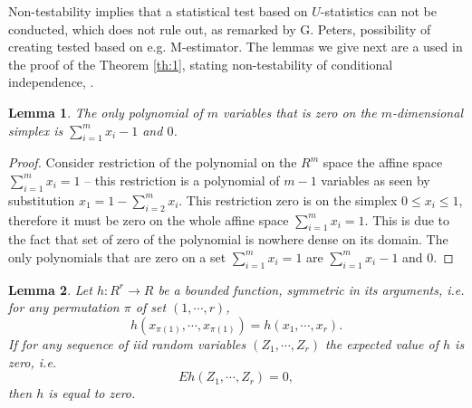 \documentclass{article}
\newtheorem{lemma}{Lemma}
\begin{document}
Non-testability implies that a statistical test based on $U$-statistics can not be conducted, which does not rule out, as remarked by G. Peters, possibility of creating tested based on e.g. M-estimator.  The lemmas we give next are a used in the proof of the Theorem  \ref{th:1}, stating non-testability of conditional independence, . 

\begin{lemma}
\label{lem:aha}
 The only polynomial of $m$ variables that is zero on the $m$-dimensional simplex is $\sum_{i=1}^m x_i-1$ and $0$.  
\end{lemma}
\begin{proof}
Consider restriction of the polynomial on the $R^m$ space  the affine space $\sum_{i=1}^m x_i=1$  -- this restriction is a polynomial of $m-1$ variables as seen by substitution $x_1 = 1 -\sum_{i=2}^m x_i$. This restriction zero is on the simplex $0 \leq x_i \leq 1$, therefore it must be zero on the whole affine space  $\sum_{i=1}^m x_i=1$. This is due to the fact that set of zero of the polynomial is nowhere dense on its domain. The only polynomials that are zero on a set $\sum_{i=1}^m x_i=1$ are $\sum_{i=1}^m x_i-1$ and $0$.   
\end{proof}


\begin{lemma}
\label{the:Lemma}
Let $h: R^r \to R$ be a bounded function, symmetric in its arguments, i.e. for any permutation $\pi$ of set $(1,\cdots,r)$,
$$
h(x_{\pi(1)},\cdots,x_{\pi(1)}) = h(x_1,\cdots,x_r).   
$$
If for any sequence of iid random variables $(Z_1,\cdots,Z_r)$ the expected value of $h$ is zero, i.e.
$$
E h(Z_1,\cdots,Z_r) = 0,
$$
then $h$ is equal to zero.
\end{lemma}
\end{document}
